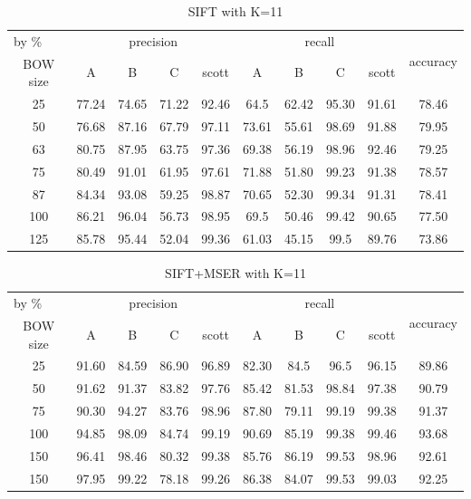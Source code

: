 \documentclass{article}
\begin{document}
\begin{table}[]
\begin{tabular}{|c|c|c|c|c|c|c|c|c|c|}
\hline
\multicolumn{1}{|l|}{by \%} & \multicolumn{4}{c|}{precision} & \multicolumn{4}{c|}{recall} & \multicolumn{1}{l|}{\multirow{2}{*}{accuracy}} \\ \cline{1-9}
BOW size & A & B & C & scott & A & B & C & scott & \multicolumn{1}{l|}{} \\ \hline
25 & 77.24 & 74.65 & 71.22 & 92.46 & 64.5 & 62.42 & 95.30 & 91.61 & 78.46 \\ \hline
50 & 76.68 & 87.16 & 67.79 & 97.11 & 73.61 & 55.61 & 98.69 & 91.88 & 79.95 \\ \hline
63 & 80.75 & 87.95 & 63.75 & 97.36 & 69.38 & 56.19 & 98.96 & 92.46 & 79.25 \\ \hline
75 & 80.49 & 91.01 & 61.95 & 97.61 & 71.88 & 51.80 & 99.23 & 91.38 & 78.57 \\ \hline
87 & 84.34 & 93.08 & 59.25 & 98.87 & 70.65 & 52.30 & 99.34 & 91.31 & 78.41 \\ \hline
100 & 86.21 & 96.04 & 56.73 & 98.95 & 69.5 & 50.46 & 99.42 & 90.65 & 77.50 \\ \hline
125 & 85.78 & 95.44 & 52.04 & 99.36 & 61.03 & 45.15 & 99.5 & 89.76 & 73.86 \\ \hline
\end{tabular}
\caption{SIFT with K=11}
\end{table}

\begin{table}[]
\begin{tabular}{|c|c|c|c|c|c|c|c|c|c|}
\hline
\multicolumn{1}{|l|}{by \%} & \multicolumn{4}{c|}{precision} & \multicolumn{4}{c|}{recall} & \multicolumn{1}{l|}{\multirow{2}{*}{accuracy}} \\ \cline{1-9}
BOW size & A & B & C & scott & A & B & C & scott & \multicolumn{1}{l|}{} \\ \hline
25 & 91.60 & 84.59 & 86.90 & 96.89 & 82.30 & 84.5 & 96.5 & 96.15 & 89.86 \\ \hline
50 & 91.62 & 91.37 & 83.82 & 97.76 & 85.42 & 81.53 & 98.84 & 97.38 & 90.79 \\ \hline
75 & 90.30 & 94.27 & 83.76 & 98.96 & 87.80 & 79.11 & 99.19 & 99.38 & 91.37 \\ \hline
100 & 94.85 & 98.09 & 84.74 & 99.19 & 90.69 & 85.19 & 99.38 & 99.46 & 93.68 \\ \hline
150 & 96.41 & 98.46 & 80.32 & 99.38 & 85.76 & 86.19 & 99.53 & 98.96 & 92.61 \\ \hline
150 & 97.95 & 99.22 & 78.18 & 99.26 & 86.38 & 84.07 & 99.53 & 99.03 & 92.25 \\ \hline
\end{tabular}
\caption{SIFT+MSER with K=11}
\end{table}
\end{document}
